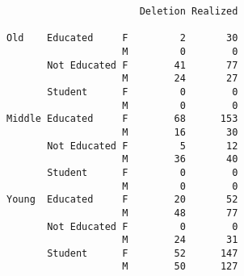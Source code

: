 \documentclass[
  12pt,
  letterpaper]{article}
\newenvironment{Shaded}{\begin{snugshade}}{\end{snugshade}}
\newcommand{\CommentTok}[1]{\textcolor[rgb]{0.37,0.37,0.37}{#1}}
\newcommand{\FunctionTok}[1]{\textcolor[rgb]{0.28,0.35,0.67}{#1}}
\newcommand{\NormalTok}[1]{\textcolor[rgb]{0.00,0.23,0.31}{#1}}
\newcommand{\SpecialCharTok}[1]{\textcolor[rgb]{0.37,0.37,0.37}{#1}}
\begin{document}
\begin{verbatim}
                       Deletion Realized
                                        
Old    Educated     F         2       30
                    M         0        0
       Not Educated F        41       77
                    M        24       27
       Student      F         0        0
                    M         0        0
Middle Educated     F        68      153
                    M        16       30
       Not Educated F         5       12
                    M        36       40
       Student      F         0        0
                    M         0        0
Young  Educated     F        20       52
                    M        48       77
       Not Educated F         0        0
                    M        24       31
       Student      F        52      147
                    M        50      127
\end{verbatim}

\begin{Shaded}
\end{Shaded}
\end{document}
